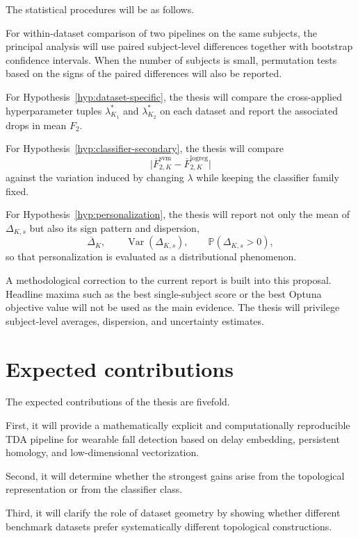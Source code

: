 \documentclass[11pt]{article}
\DeclareMathOperator{\Var}{Var}
\newcommand{\Prob}{\mathbb P}
\newcommand{\1}{\mathbf 1}
\begin{document}
The statistical procedures will be as follows.

For within-dataset comparison of two pipelines on the same subjects, the principal analysis will use paired subject-level differences together with bootstrap confidence intervals. When the number of subjects is small, permutation tests based on the signs of the paired differences will also be reported.

For Hypothesis~\ref{hyp:dataset-specific}, the thesis will compare the cross-applied hyperparameter tuples $\lambda^\ast_{K_1}$ and $\lambda^\ast_{K_2}$ on each dataset and report the associated drops in mean $F_2$.

For Hypothesis~\ref{hyp:classifier-secondary}, the thesis will compare
\[
  \bigl|\overline{F}_{2,K}^{\mathrm{svm}}-\overline{F}_{2,K}^{\mathrm{logreg}}\bigr|
\]
against the variation induced by changing $\lambda$ while keeping the classifier family fixed.

For Hypothesis~\ref{hyp:personalization}, the thesis will report not only the mean of $\Delta_{K,s}$ but also its sign pattern and dispersion,
\[
  \overline{\Delta}_K,
  \qquad
  \Var(\Delta_{K,s}),
  \qquad
  \Prob(\Delta_{K,s}>0),
\]
so that personalization is evaluated as a distributional phenomenon.

A methodological correction to the current report is built into this proposal. Headline maxima such as the best single-subject score or the best Optuna objective value will not be used as the main evidence. The thesis will privilege subject-level averages, dispersion, and uncertainty estimates.

\section{Expected contributions}

The expected contributions of the thesis are fivefold.

First, it will provide a mathematically explicit and computationally reproducible TDA pipeline for wearable fall detection based on delay embedding, persistent homology, and low-dimensional vectorization.

Second, it will determine whether the strongest gains arise from the topological representation or from the classifier class.

Third, it will clarify the role of dataset geometry by showing whether different benchmark datasets prefer systematically different topological constructions.
\end{document}
